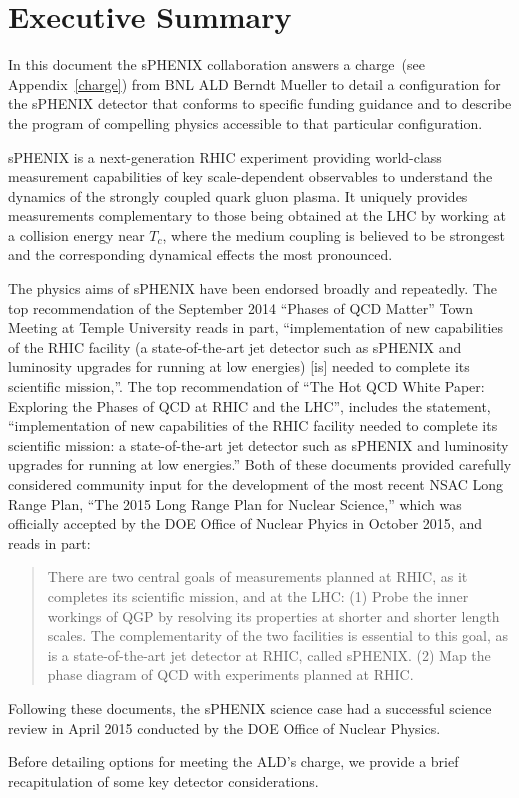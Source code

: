 \chapter*{Executive Summary}
\label{executive_summary}
\setcounter{page}{1}

In this document the sPHENIX collaboration answers a charge~(see
Appendix~\ref{charge}) from BNL ALD Berndt Mueller to detail a
configuration for the sPHENIX detector that conforms to specific
funding guidance and to describe the program of compelling physics
accessible to that particular configuration.

sPHENIX is a next-generation RHIC experiment providing world-class
measurement capabilities of key scale-dependent observables to
understand the dynamics of the strongly coupled quark gluon plasma.
It uniquely provides measurements complementary to those being
obtained at the LHC by working at a collision energy near $T_c$, where
the medium coupling is believed to be strongest and the corresponding
dynamical effects the most pronounced.

The physics aims of sPHENIX have been endorsed broadly and repeatedly.
The top recommendation of the September 2014 “Phases of QCD Matter”
Town Meeting at Temple University reads in part, ``implementation of
new capabilities of the RHIC facility (a state-of-the-art jet detector
such as sPHENIX and luminosity upgrades for running at low energies)
[is] needed to complete its scientific mission,''.  The top
recommendation of ``The Hot QCD White Paper: Exploring the Phases of
QCD at RHIC and the LHC'', includes the statement, ``implementation of
new capabilities of the RHIC facility needed to complete its
scientific mission: a state-of-the-art jet detector such as sPHENIX
and luminosity upgrades for running at low energies.'' Both of these
documents provided carefully considered community input for the
development of the most recent NSAC Long Range Plan, ``The 2015 Long
Range Plan for Nuclear Science,'' which was officially accepted by the
DOE Office of Nuclear Phyics in October 2015, and reads in part:

\blockquote{There are two central goals of measurements planned at
  RHIC, as it completes its scientific mission, and at the LHC: (1)
  Probe the inner workings of QGP by resolving its properties at
  shorter and shorter length scales. The complementarity of the two
  facilities is essential to this goal, as is a state-of-the-art jet
  detector at RHIC, called sPHENIX. (2) Map the phase diagram of QCD
  with experiments planned at RHIC.}

Following these documents, the sPHENIX science case had a successful
science review in April 2015 conducted by the DOE Office of Nuclear
Physics.

Before detailing options for meeting the ALD's charge, we provide a
brief recapitulation of some key detector considerations.


\nocite{*}

